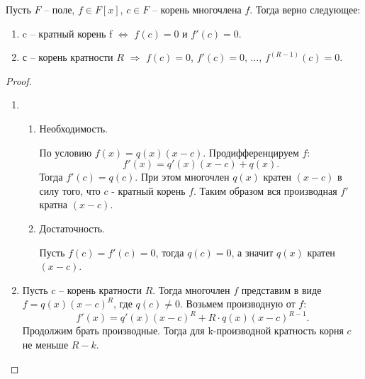 \begin{theorem}
    Пусть $F$ -- поле, $f \in F[x]$, $c \in F$ -- корень многочлена $f$. Тогда верно следующее:
    \begin{enumerate}
        \item c -- кратный корень f $\Leftrightarrow$ $f(c) = 0$ и $f'(c) = 0$.
        \item с -- корень кратности $R$ $\Rightarrow$ $f(c) = 0$, $f'(c) = 0$, $\dots$, $f^{(R-1)}(c) = 0$.
    \end{enumerate}
\end{theorem}

\begin{proof}~
    \begin{enumerate}
        \item \begin{enumerate}
            \item Необходимость.
            
            По условию $f(x) = q(x) (x-c)$. Продифференцируем $f$:
            $$f'(x) = q'(x) (x-c) + q(x).$$ 
            Тогда $f'(c) = q(c)$. При этом многочлен $q(x)$ кратен $(x-c)$ в силу того, что $c$ - кратный корень $f$. 
            Таким образом вся производная $f'$ кратна $(x-c)$. 
            
            \item Достаточность.
            
            Пусть $f(c) = f'(c) = 0$, тогда $q(c) = 0$, а значит $q(x)$ кратен $(x-c)$.
            
        \end{enumerate}

        \item Пусть $c$ -- корень кратности $R$. Тогда многочлен $f$ представим в виде $f = q(x) (x-c)^R$, где $q(c) \neq 0$.
        Возьмем производную от $f$:
        $$f'(x) = q'(x) (x-c)^R + R \cdot q(x) (x-c)^{R-1}.$$ 
        Продолжим брать производные. Тогда для 
        k-производной кратность корня $c$ не меньше $R-k$.
    \end{enumerate}
\end{proof}
